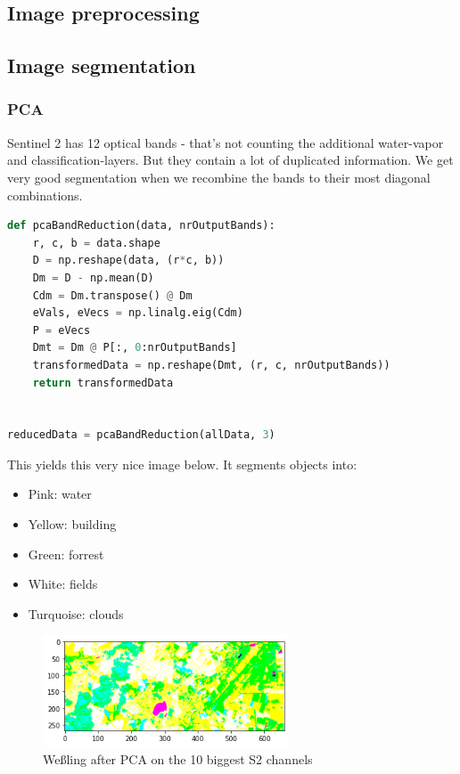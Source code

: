 \subsection{Image preprocessing}

\subsection{Image segmentation}


\subsubsection{PCA}
Sentinel 2 has 12 optical bands - that's not counting the additional water-vapor and classification-layers.
But they contain a lot of duplicated information.
We get very good segmentation when we recombine the bands to their most diagonal combinations.

\begin{lstlisting}[language=python]
def pcaBandReduction(data, nrOutputBands):
    r, c, b = data.shape
    D = np.reshape(data, (r*c, b))
    Dm = D - np.mean(D)
    Cdm = Dm.transpose() @ Dm
    eVals, eVecs = np.linalg.eig(Cdm)
    P = eVecs
    Dmt = Dm @ P[:, 0:nrOutputBands]
    transformedData = np.reshape(Dmt, (r, c, nrOutputBands))
    return transformedData


reducedData = pcaBandReduction(allData, 3)
\end{lstlisting}

This yields this very nice image below. It segments  objects into: 
\begin{itemize}
    \item Pink: water
    \item Yellow: building
    \item Green: forrest
    \item White: fields
    \item Turquoise: clouds
\end{itemize}

\begin{figure}[H]
    \caption{Weßling after PCA on the 10 biggest S2 channels}
    \centering
      \includegraphics[width=0.65\textwidth]{images/pca_wessling.png}
\end{figure}

